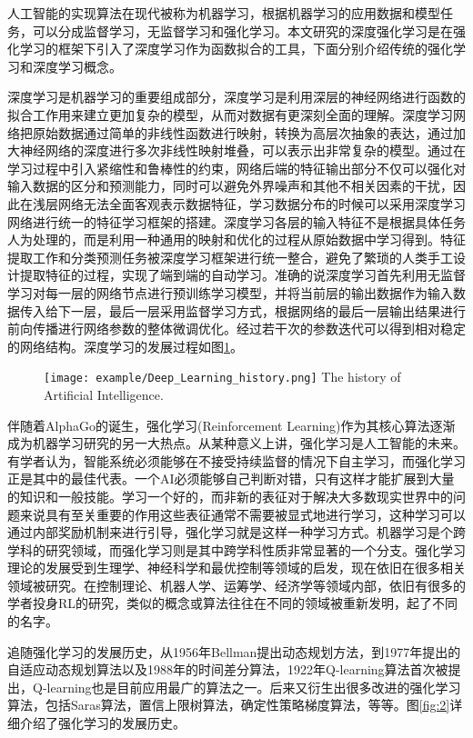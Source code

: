人工智能的实现算法在现代被称为机器学习，根据机器学习的应用数据和模型任务，可以分成监督学习，无监督学习和强化学习。本文研究的深度强化学习是在强化学习的框架下引入了深度学习作为函数拟合的工具，下面分别介绍传统的强化学习和深度学习概念。

深度学习是机器学习的重要组成部分，深度学习是利用深层的神经网络进行函数的拟合工作用来建立更加复杂的模型，从而对数据有更深刻全面的理解。深度学习网络把原始数据通过简单的非线性函数进行映射，转换为高层次抽象的表达，通过加大神经网络的深度进行多次非线性映射堆叠，可以表示出非常复杂的模型。通过在学习过程中引入紧缩性和鲁棒性的约束，网络后端的特征输出部分不仅可以强化对输入数据的区分和预测能力，同时可以避免外界噪声和其他不相关因素的干扰，因此在浅层网络无法全面客观表示数据特征，学习数据分布的时候可以采用深度学习网络进行统一的特征学习框架的搭建。深度学习各层的输入特征不是根据具体任务人为处理的，而是利用一种通用的映射和优化的过程从原始数据中学习得到。特征提取工作和分类预测任务被深度学习框架进行统一整合，避免了繁琐的人类手工设计提取特征的过程，实现了端到端的自动学习。准确的说深度学习首先利用无监督学习对每一层的网络节点进行预训练学习模型，并将当前层的输出数据作为输入数据传入给下一层，最后一层采用监督学习方式，根据网络的最后一层输出结果进行前向传播进行网络参数的整体微调优化。经过若干次的参数迭代可以得到相对稳定的网络结构。深度学习的发展过程如图\ref{fig:test}。
\begin{figure}[htpb]
	\centering
	\texttt{[image: example/Deep\_Learning\_history.png]}
	{The history of Artificial Intelligence.}
	\label{fig:test}
\end{figure}

伴随着AlphaGo的诞生，强化学习(Reinforcement Learning)作为其核心算法逐渐成为机器学习研究的另一大热点。从某种意义上讲，强化学习是人工智能的未来。有学者认为，智能系统必须能够在不接受持续监督的情况下自主学习，而强化学习正是其中的最佳代表。一个AI必须能够自己判断对错，只有这样才能扩展到大量的知识和一般技能。学习一个好的，而非新的表征对于解决大多数现实世界中的问题来说具有至关重要的作用这些表征通常不需要被显式地进行学习，这种学习可以通过内部奖励机制来进行引导，强化学习就是这样一种学习方式。机器学习是个跨学科的研究领域，而强化学习则是其中跨学科性质非常显著的一个分支。强化学习理论的发展受到生理学、神经科学和最优控制等领域的启发，现在依旧在很多相关领域被研究。在控制理论、机器人学、运筹学、经济学等领域内部，依旧有很多的学者投身RL的研究，类似的概念或算法往往在不同的领域被重新发明，起了不同的名字。

追随强化学习的发展历史，从1956年Bellman提出动态规划方法，到1977年提出的自适应动态规划算法以及1988年的时间差分算法，1922年Q-learning算法首次被提出，Q-learning也是目前应用最广的算法之一。后来又衍生出很多改进的强化学习算法，包括Saras算法，置信上限树算法，确定性策略梯度算法，等等。图\ref{fig:2}详细介绍了强化学习的发展历史。

